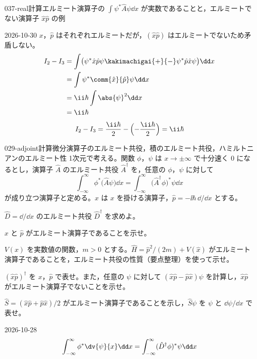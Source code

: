 \documentclass[uplatex,dvipdfmx,a4paper,11pt]{jsarticle}
\begin{document}
\begin{mondai}{037-real}{計算}{エルミート演算子の $\int\psi^{*}\hat{A}\psi\dd x$ が実数であることと，エルミートでない演算子 $\hat{x}\hat{p}$ の例}
\begin{kotaeutsushi}{2026-10-30}
$\hat{x}$，$\hat{p}$ はそれぞれエルミートだが，$(\hat{x}\hat{p})$ はエルミートでないため矛盾しない。
\begin{align*}
I_{2}-I_{3}&=\int\bigl(\psi^{*}\hat{x}\hat{p}\psi\kakimachigai{+}{-}\psi^{*}\hat{p}\hat{x}\psi\bigr)\dd x\\
&=\int\psi^{*}\comm{\hat{x}}{\hat{p}}\psi\dd x\\
&=\ii\hbar\int\abs{\psi}^{2}\dd x\\
&=\ii\hbar
\end{align*}
\[ I_{2}-I_{3}=\frac{\ii\hbar}{2}-\Bigl(-\frac{\ii\hbar}{2}\Bigr)=\ii\hbar \]
\end{kotaeutsushi}
\end{mondai}

\begin{mondai}{029-adjoint}{計算}{微分演算子のエルミート共役，積のエルミート共役，ハミルトニアンのエルミート性}
1次元で考える。関数 $\phi$，$\psi$ は $x\to\pm\infty$ で十分速く 0 になるとし，演算子 $\hat{A}$ のエルミート共役 $\hat{A}^{\dagger}$ を，任意の $\phi$，$\psi$ に対して
  \[ \int_{-\infty}^{\infty}\phi^{*}\bigl(\hat{A}\psi\bigr)\dd x=\int_{-\infty}^{\infty}\bigl(\hat{A}^{\dagger}\phi\bigr)^{*}\psi\dd x \]
  が成り立つ演算子と定める。$\hat{x}$ は $x$ を掛ける演算子，$\hat{p}=-\ii\hbar\,\dd /\dd x$ とする。
  \begin{shoumon}
    \item $\hat{D}=\dd /\dd x$ のエルミート共役 $\hat{D}^{\dagger}$ を求めよ。
    \item $\hat{x}$ と $\hat{p}$ がエルミート演算子であることを示せ。
    \item $V(x)$ を実数値の関数，$m>0$ とする。$\hat{H}=\hat{p}^{2}/(2m)+V(\hat{x})$ がエルミート演算子であることを，エルミート共役の性質（要点整理）を使って示せ。
    \item $(\hat{x}\hat{p})^{\dagger}$ を $\hat{x}$，$\hat{p}$ で表せ。また，任意の $\psi$ に対して $(\hat{x}\hat{p}-\hat{p}\hat{x})\psi$ を計算し，$\hat{x}\hat{p}$ がエルミート演算子でないことを示せ。
    \item $\hat{S}=(\hat{x}\hat{p}+\hat{p}\hat{x})/2$ がエルミート演算子であることを示し，$\hat{S}\psi$ を $\psi$ と $\dd \psi/\dd x$ で表せ。
  \end{shoumon}
\begin{kotaeutsushi}{2026-10-28}
\[ \int_{-\infty}^{\infty}\phi^{*}\dv{\psi}{x}\dd x=\int_{-\infty}^{\infty}(\hat{D}^{\dagger}\phi)^{*}\psi\dd x \]

\end{kotaeutsushi}
\end{mondai}
\end{document}
